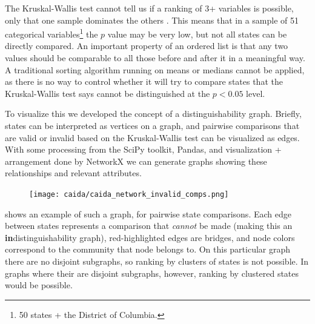 The Kruskal-Wallis test cannot tell us if a ranking of 3+ variables is possible, only that one sample dominates the others \cite{kruskal-wallis}. This means that in a sample of 51 categorical variables\footnote{50 states + the District of Columbia.} the $p$ value may be very low, but not all states can be directly compared. An important property of an ordered list is that any two values should be comparable to all those before and after it in a meaningful way. A traditional sorting algorithm running on means or medians cannot be applied, as there is no way to control whether it will try to compare states that the Kruskal-Wallis test says cannot be distinguished at the $p<0.05$ level.

To visualize this we developed the concept of a distinguishability graph. Briefly, states can be interpreted as vertices on a graph, and pairwise comparisons that are valid or invalid based on the Kruskal-Wallis test can be visualized as edges. With some processing from the SciPy toolkit, Pandas, and visualization + arrangement done by NetworkX \cite{scipy, pandas, networkx} we can generate graphs showing these relationships and relevant attributes.

\begin{figure}[h]
    \centering
    \texttt{[image: caida/caida\_network\_invalid\_comps.png]}
\end{figure}

 shows an example of such a graph, for pairwise state comparisons. Each edge between states represents a comparison that \textit{cannot} be made (making this an \textbf{in}distinguishability graph), red-highlighted edges are bridges, and node colors correspond to the community that node belongs to. On this particular graph there are no disjoint subgraphs, so ranking by clusters of states is not possible. In graphs where their are disjoint subgraphs, however, ranking by clustered states would be possible.

